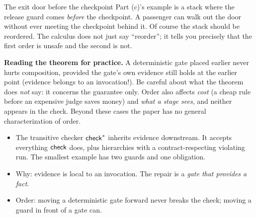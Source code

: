 \begin{story}{The exit door before the checkpoint}
Part (c)'s example is a stack where the release guard comes \emph{before} the checkpoint. A passenger can walk out the door without ever meeting the checkpoint behind it. Of course the stack should be reordered. The calculus does not just say ``reorder''; it tells you precisely that the first order is unsafe and the second is not.
\end{story}

\textbf{Reading the theorem for practice.} A deterministic gate placed earlier never hurts composition, provided the gate's own evidence still holds at the earlier point (evidence belongs to an invocation!). Be careful about what the theorem does \emph{not} say: it concerns the guarantee only. Order also affects \emph{cost} (a cheap rule before an expensive judge saves money) and \emph{what a stage sees}, and neither appears in the check. Beyond these cases the paper has no general characterization of order.


\begin{recap}
\begin{itemize}
\item The transitive checker $\mathsf{check}^{*}$ inherits evidence downstream. It accepts everything $\mathsf{check}$ does, plus hierarchies with a contract-respecting violating run. The smallest example has two guards and one obligation.
\item Why: evidence is local to an invocation. The repair is a \emph{gate that provides a fact}.
\item Order: moving a deterministic gate forward never breaks the check; moving a guard in front of a gate can.
\end{itemize}
\end{recap}

